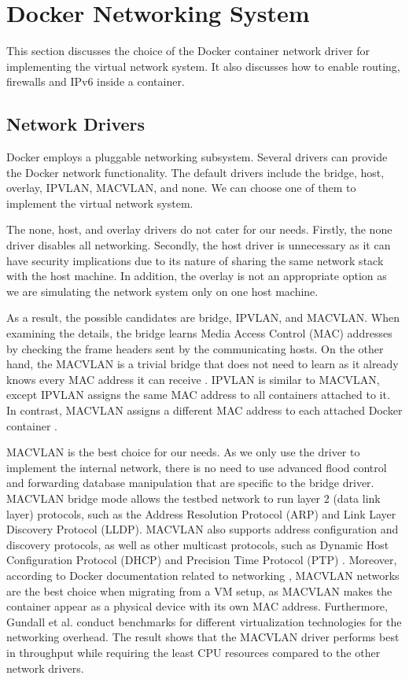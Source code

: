 \documentclass[article]{aaltoseries}
\begin{document}


\section{Docker Networking System}
This section discusses the choice of the Docker container network driver for implementing the virtual network system. It also discusses how to enable routing, firewalls and IPv6 inside a container.

\subsection{Network Drivers}
Docker employs a pluggable networking subsystem. Several drivers can provide the Docker network functionality. The default drivers include the bridge, host, overlay, IPVLAN, MACVLAN, and none. We can choose one of them to implement the virtual network system.

The none, host, and overlay drivers do not cater for our needs. Firstly, the none driver disables all networking. Secondly, the host driver is unnecessary as it can have security implications due to its nature of sharing the same network stack with the host machine. In addition, the overlay is not an appropriate option as we are simulating the network system only on one host machine.

As a result, the possible candidates are bridge, IPVLAN, and MACVLAN. When examining the details, the bridge learns Media Access Control (MAC) addresses by checking the frame headers sent by the communicating hosts. On the other hand, the MACVLAN is a trivial bridge that does not need to learn as it already knows every MAC address it can receive \cite{9620212}. IPVLAN is similar to MACVLAN, except IPVLAN assigns the same MAC address to all containers attached to it. In contrast, MACVLAN assigns a different MAC address to each attached Docker container \cite{7502883}.

MACVLAN is the best choice for our needs. As we only use the driver to implement the internal network, there is no need to use advanced flood control and forwarding database manipulation that are specific to the bridge driver. MACVLAN bridge mode allows the testbed network to run layer 2 (data link layer) protocols, such as the Address Resolution Protocol (ARP) and Link Layer Discovery Protocol (LLDP). MACVLAN also supports address configuration and discovery protocols, as well as other multicast protocols, such as Dynamic Host Configuration Protocol (DHCP) \cite{9708884} and Precision Time Protocol (PTP) \cite{9613320}. Moreover, according to Docker documentation related to networking \cite{docker_documentation_2023}, MACVLAN networks are the best choice when migrating from a VM setup, as MACVLAN makes the container appear as a physical device with its own MAC address. Furthermore, Gundall et al. \cite{9442123} conduct benchmarks for different virtualization technologies for the networking overhead. The result shows that the MACVLAN driver performs best in throughput while requiring the least CPU resources compared to the other network drivers.
\end{document}
